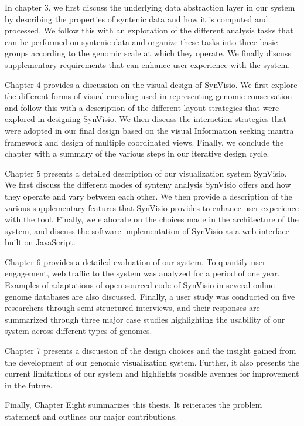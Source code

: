 In chapter 3, we first discuss the underlying data abstraction layer in our system by describing the properties of syntenic data and how it is computed and processed. We follow this with an exploration of the different analysis tasks that can be performed on syntenic data and organize these tasks into three basic groups according to the genomic scale at which they operate. We finally discuss supplementary requirements that can enhance user experience with the system.

 Chapter 4 provides a discussion on the visual design of SynVisio. We first explore the different forms of visual encoding used in representing genomic conservation and follow this with a description of the different layout strategies that were explored in designing SynVisio. We then discuss the interaction strategies that were adopted in our final design based on the visual Information seeking mantra framework and design of multiple coordinated views. Finally, we conclude the chapter with a summary of the various steps in our iterative design cycle.

Chapter 5 presents a detailed description of our visualization system SynVisio. We first discuss the different modes of synteny analysis SynVisio offers and how they operate and vary between each other. We then provide a description of the various supplementary features that SynVisio provides to enhance user experience with the tool. Finally, we elaborate on the choices made in the architecture of the system,
and discuss the software implementation of SynVisio as a web interface built on JavaScript.

Chapter 6 provides a detailed evaluation of our system. To quantify user engagement, web traffic to the system was analyzed for a period of one year. Examples of adaptations of open-sourced code of SynVisio in several online genome databases are also discussed. Finally, a user study was conducted on five researchers through semi-structured interviews, and their responses are summarized through three major case studies highlighting the usability of our system across different types of genomes.

Chapter 7 presents a discussion of the design choices and the insight gained from the development of our genomic visualization system. Further, it also presents the current limitations of our system and highlights possible avenues for improvement in the future.

Finally, Chapter Eight summarizes this thesis. It reiterates the problem statement and outlines our major contributions.
